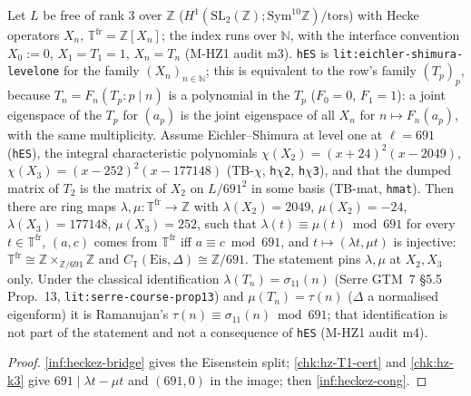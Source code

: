 \begin{theorem}\label{chk:hz-T1}
  \leanok
  Let $L$ be free of rank $3$ over $\mathbb Z$ ($H^1(\mathrm{SL}_2(\mathbb Z);\mathrm{Sym}^{10}\mathbb Z)/\mathrm{tors}$) with Hecke operators
  $X_n$, $\mathbb T^{\mathrm{fr}}=\mathbb Z[X_n]$; the index runs over $\mathbb N$, with the interface convention $X_0:=0$, $X_1=T_1=1$,
  $X_n=T_n$ (M-HZ1 audit m3). \texttt{hES} is \texttt{lit:eichler-shimura-levelone} for the family $(X_n)_{n\in\mathbb N}$; this is
  equivalent to the row's family $(T_p)_p$, because $T_n=F_n(T_p:p\mid n)$ is a polynomial in the $T_p$ ($F_0=0$, $F_1=1$): a joint
  eigenspace of the $T_p$ for $(a_p)$ is the joint eigenspace of all $X_n$ for $n\mapsto F_n(a_p)$, with the same multiplicity. Assume Eichler--Shimura at level one at $\ell=691$ (\texttt{hES}), the integral
  characteristic polynomials $\chi(X_2)=(x+24)^2(x-2049)$, $\chi(X_3)=(x-252)^2(x-177148)$ (TB-$\chi$, \texttt{h$\chi$2}, \texttt{h$\chi$3}),
  and that the dumped matrix of $T_2$ is the matrix of $X_2$ on $L/691^2$ in some basis (TB-mat, \texttt{hmat}). Then there are ring
  maps $\lambda,\mu:\mathbb T^{\mathrm{fr}}\to\mathbb Z$ with $\lambda(X_2)=2049$, $\mu(X_2)=-24$, $\lambda(X_3)=177148$, $\mu(X_3)=252$, such
  that $\lambda(t)\equiv\mu(t)\bmod691$ for every $t\in\mathbb T^{\mathrm{fr}}$, $(a,c)$ comes from $\mathbb T^{\mathrm{fr}}$ iff $a\equiv c\bmod691$,
  and $t\mapsto(\lambda t,\mu t)$ is injective: $\mathbb T^{\mathrm{fr}}\cong\mathbb Z\times_{\mathbb Z/691}\mathbb Z$ and
  $C_{\mathbb T}(\mathrm{Eis},\Delta)\cong\mathbb Z/691$. The statement pins $\lambda,\mu$ at $X_2,X_3$ only. Under the classical
  identification $\lambda(T_n)=\sigma_{11}(n)$ (Serre GTM~7 \S5.5 Prop.~13, \texttt{lit:serre-course-prop13}) and $\mu(T_n)=\tau(n)$ ($\Delta$
  a normalised eigenform) it is Ramanujan's $\tau(n)\equiv\sigma_{11}(n)\bmod691$; that identification is not part of the
  statement and not a consequence of \texttt{hES} (M-HZ1 audit m4).
\end{theorem}
\begin{proof}
  \leanok
  \ref{inf:heckez-bridge} gives the Eisenstein split; \ref{chk:hz-T1-cert} and \ref{chk:hz-k3} give $691\mid\lambda t-\mu t$ and $(691,0)$ in the
  image; then \ref{inf:heckez-cong}.
\end{proof}

